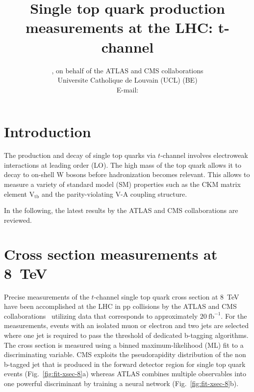 \documentclass{PoS}
\title{Single top quark production measurements at the LHC: t-channel}
\author{
    \speaker{Matthias Komm}, on behalf of the ATLAS and CMS collaborations\\
    Universite Catholique de Louvain (UCL) (BE)\\
    E-mail: \email{Matthias.Komm@cern.ch}
}
\begin{document}
\section{Introduction}
The production and decay of single top quarks via $t$-channel involves electroweak interactions at leading order (LO). The high mass of the top quark allows it to decay to on-shell W bosons before hadronization becomes relevant. This allows to measure a variety of standard model (SM) properties such as the CKM matrix element $\mathrm{V_{tb}}$ and the parity-violating V-A coupling structure.

In the following, the latest results by the ATLAS and CMS collaborations are reviewed.

\section{Cross section measurements at 8~TeV}
Precise measurements of the $t$-channel single top quark cross section at 8~TeV have been accomplished at the LHC in pp collisions by the ATLAS and CMS collaborations~\cite{atlas-xsec8,cms-xsec8} utilizing data that corresponds to approximately $20~\mathrm{fb}^{-1}$. For the measurements, events with an isolated muon or electron and two jets are selected where one jet is required to pass the threshold of dedicated b-tagging algorithms. The cross section is measured using a binned maximum-likelihood (ML) fit to a discriminating variable. CMS exploits the pseudorapidity distribution of the non b-tagged jet that is produced in the forward detector region for single top quark events (Fig.~\ref{fig:fit-xsec-8}a) whereas ATLAS combines multiple observables into one powerful discriminant by training a neural network (Fig.~\ref{fig:fit-xsec-8}b).
\end{document}
